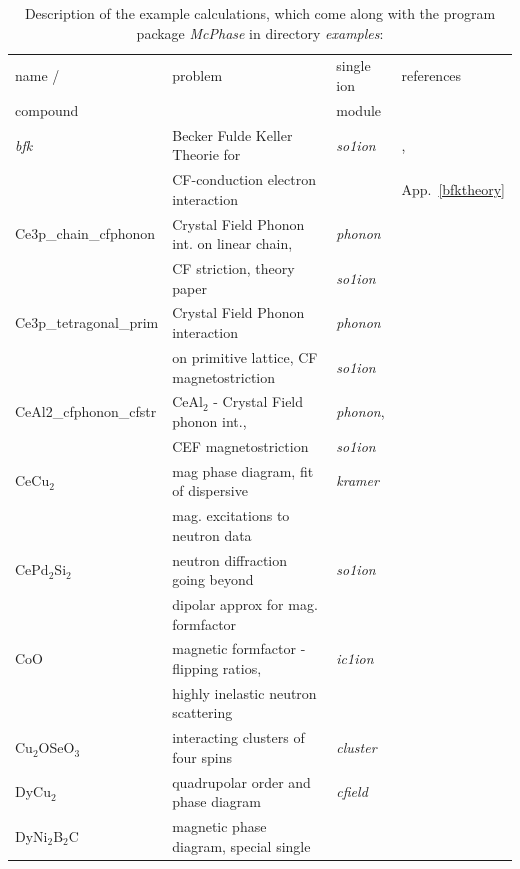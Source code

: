 \documentclass[twoside]{article}
\newcommand{\prg}{\sl}
\begin{document}
\begin{table}[thb] 
\begin{center}  
\caption {Description of the example calculations, which come along with the program package {\prg McPhase} in directory {\prg %
examples}:}   
\label{examples}   
\begin{tabular} 
{l|l|l|l}
name /       & problem & single ion & references \\ 
compound     &          & module  &             \\
\hline
{\prg bfk }    & Becker Fulde Keller Theorie for & {\prg so1ion }\index{bfk} &  \cite{becker77-9}, \\
               &  CF-conduction electron interaction & &  App.~\ref{bfktheory}\\
Ce3p\_chain\_cfphonon & Crystal Field Phonon int. on linear chain, & {\prg phonon } & \\
                      &   CF striction, theory paper & {\prg so1ion } & \\
Ce3p\_tetragonal\_prim & Crystal Field Phonon interaction & {\prg phonon} &  \\
                     &  on primitive lattice, CF magnetostriction & {\prg so1ion } & \\
CeAl2\_cfphonon\_cfstr &  CeAl$_2$ - Crystal Field phonon int., & {\prg phonon}, &  \\
                       &   CEF magnetostriction &   {\prg so1ion } &  \\
CeCu$_2$       & mag phase diagram, fit of dispersive  & {\prg kramer}\index{kramer} & \cite{loewenhaupt06-775,schedler03-1313} \\
               & mag. excitations to neutron data      &               & \\
CePd$_2$Si$_2$ & neutron diffraction going beyond  & {\prg %
so1ion}&\cite{rotter09-140405} \\
               & dipolar approx for mag. formfactor & &\\     
CoO            & magnetic formfactor - flipping ratios,   &{\prg  ic1ion} & \\
               & highly inelastic neutron scattering      &               & \\
Cu$_2$OSeO$_3$ & interacting clusters of four spins & {\prg cluster} & \cite{romhany14-xxx}\\
DyCu$_2$       & quadrupolar order and phase diagram & {\prg cfield}\index{cfield}&\cite{yoshida98-1421} \\
DyNi$_2$B$_2$C & magnetic phase diagram, special single  & {\prg %
}
\end{tabular}
\end{center}
\end{table}
\end{document}
